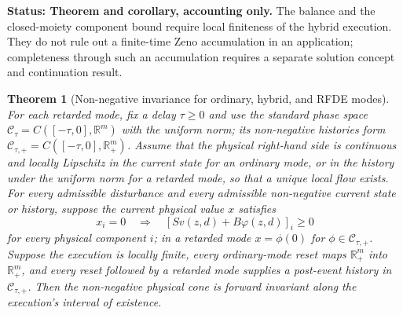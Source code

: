 \documentclass[11pt]{article}
\newtheorem{theorem}{Theorem}
\theoremstyle{definition}
\newcommand{\status}[1]{\par\smallskip\noindent\textbf{Status: #1.}\quad}
\begin{document}
\status{Theorem and corollary, accounting only} The balance and the closed-moiety component bound require local finiteness of the hybrid execution. They do not rule out a finite-time Zeno accumulation in an application; completeness through such an accumulation requires a separate solution concept and continuation result.

\begin{theorem}[Non-negative invariance for ordinary, hybrid, and RFDE modes]
\label{thm:invariance}
For each retarded mode, fix a delay $\tau\ge0$ and use the standard phase
space $\mathcal C_\tau=C([ -\tau,0],\mathbb R^m)$ with the uniform norm; its
non-negative histories form
$\mathcal C_{\tau,+}=C([ -\tau,0],\mathbb R_+^m)$. Assume that the physical
right-hand side is continuous and locally Lipschitz in the current state for
an ordinary mode, or in the history under the uniform norm for a retarded
mode, so that a unique local flow exists. For every admissible disturbance
and every admissible non-negative current state or history, suppose the
current physical value $x$ satisfies
\begin{equation}
 x_i=0\quad\Longrightarrow\quad
 [Sv(z,d)+B\varphi(z,d)]_i\ge0
\label{eq:tangent-condition}
\end{equation}
for every physical component $i$; in a retarded mode $x=\phi(0)$ for
$\phi\in\mathcal C_{\tau,+}$. Suppose the execution is locally finite, every
ordinary-mode reset maps $\mathbb R_+^m$ into $\mathbb R_+^m$, and every reset
followed by a retarded mode supplies a post-event history in
$\mathcal C_{\tau,+}$. Then the non-negative physical cone is forward
invariant along the execution's interval of existence.
\end{theorem}
\end{document}
